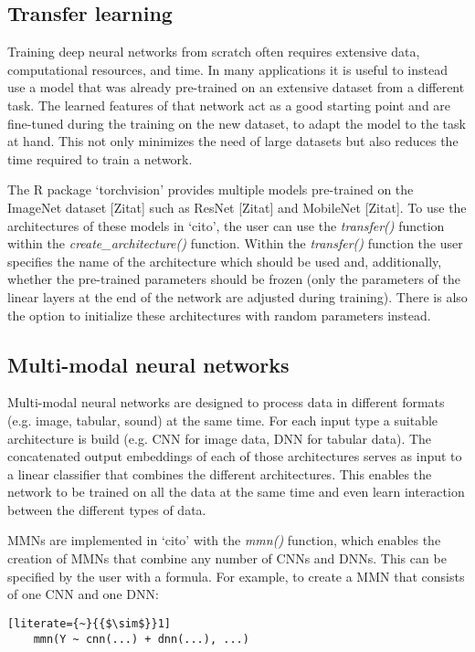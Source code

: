 \documentclass{article}
\newcommand{\pkg}[1]{`#1'}
\newcommand{\fn}[2][]{\textit{#2(}#1\textit{)}}
\begin{document}
\subsection{Transfer learning}
Training deep neural networks from scratch often requires extensive data, computational resources, and time. In many applications it is useful to instead use a model that was already pre-trained on an extensive dataset from a different task. The learned features of that network act as a good starting point and are fine-tuned during the training on the new dataset, to adapt the model to the task at hand. This not only minimizes the need of large datasets but also reduces the time required to train a network.

The R package \pkg{torchvision} provides multiple models pre-trained on the ImageNet dataset [Zitat] such as ResNet [Zitat] and MobileNet [Zitat]. To use the architectures of these models in \pkg{cito}, the user can use the \fn{transfer} function within the \fn{create\_architecture} function. Within the \fn{transfer} function the user specifies the name of the architecture which should be used and, additionally, whether the pre-trained parameters should be frozen (only the parameters of the linear layers at the end of the network are adjusted during training). There is also the option to initialize these architectures with random parameters instead.

\subsection{Multi-modal neural networks}
Multi-modal neural networks are designed to process data in different formats (e.g. image, tabular, sound) at the same time. For each input type a suitable architecture is build (e.g. CNN for image data, DNN for tabular data). The concatenated output embeddings of each of those architectures serves as input to a linear classifier that combines the different architectures. This enables the network to be trained on all the data at the same time and even learn interaction between the different types of data.

MMNs are implemented in \pkg{cito} with the \fn{mmn} function, which enables the creation of MMNs that combine any number of CNNs and DNNs. This can be specified by the user with a formula. For example, to create a MMN that consists of one CNN and one DNN:

\begin{lstlisting}[literate={~}{{$\sim$}}1]
	mmn(Y ~ cnn(...) + dnn(...), ...)
\end{lstlisting}
\end{document}
